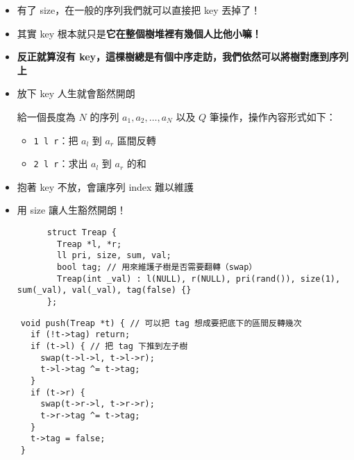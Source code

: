 \documentclass[standalone]{beamer}
\begin{document}
\begin{frame}[fragile]{}
  \begin{itemize}
    \item 有了 size，在一般的序列我們就可以直接把 key 丟掉了！
    \item 其實 key 根本就只是\textbf{它在整個樹堆裡有幾個人比他小嘛！}
    \item \textbf{反正就算沒有 key，這棵樹總是有個中序走訪，我們依然可以將樹對應到序列上}
    \item 放下 key 人生就會豁然開朗
    \begin{problem}
      給一個長度為 $N$ 的序列 $a_1, a_2, \dots, a_N$ 以及 $Q$ 筆操作，操作內容形式如下：
      
      \begin{itemize}
        \item \texttt{1 l r}：把 $a_l$ 到 $a_r$ 區間反轉
        \item \texttt{2 l r}：求出 $a_l$ 到 $a_r$ 的和
      \end{itemize}
    \end{problem}
  \end{itemize}
\end{frame}

\begin{frame}[fragile]{}
  \begin{itemize}
    \item 抱著 key 不放，會讓序列 index 難以維護
    \item 用 size 讓人生豁然開朗！
    \begin{verbatim}
      struct Treap {
        Treap *l, *r;
        ll pri, size, sum, val;
        bool tag; // 用來維護子樹是否需要翻轉（swap）
        Treap(int _val) : l(NULL), r(NULL), pri(rand()), size(1), sum(_val), val(_val), tag(false) {}
      };
    \end{verbatim}
  \end{itemize}
\end{frame}

\begin{frame}[fragile]{}
  \begin{verbatim}
    void push(Treap *t) { // 可以把 tag 想成要把底下的區間反轉幾次
      if (!t->tag) return;
      if (t->l) { // 把 tag 下推到左子樹
        swap(t->l->l, t->l->r);
        t->l->tag ^= t->tag;
      }
      if (t->r) {
        swap(t->r->l, t->r->r);
        t->r->tag ^= t->tag;
      }
      t->tag = false;
    }
  \end{verbatim}
\end{frame}
\end{document}
